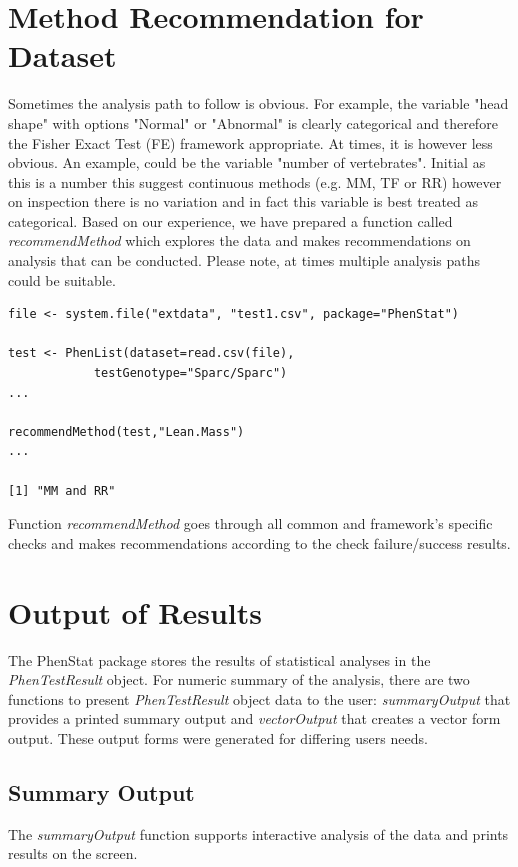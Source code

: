 \documentclass[12pt,a4paper]{article}
\begin{document}
\section{Method Recommendation for Dataset}
\label{section:Recommendation}

Sometimes the analysis path to follow is obvious. For example, the variable "head shape" with options "Normal" or "Abnormal" is clearly categorical and therefore the Fisher Exact Test (FE) framework appropriate. At times, it is however less obvious. An example, could be the variable "number of vertebrates". Initial as this is a number this suggest continuous methods (e.g. MM, TF or RR)  however on inspection there is no variation and in fact this variable is best treated as categorical. Based on our experience, we have prepared a function called \textit{recommendMethod} which explores the data and makes recommendations on analysis that can be conducted. Please note, at times multiple analysis paths could be suitable. 


\begingroup
\fontsize{8pt}{12pt}\selectfont
\begin{verbatim}
file <- system.file("extdata", "test1.csv", package="PhenStat")

test <- PhenList(dataset=read.csv(file),
            testGenotype="Sparc/Sparc")
...

recommendMethod(test,"Lean.Mass")
...

[1] "MM and RR"
\end{verbatim}
\endgroup

Function \textit{recommendMethod} goes through all common and framework's specific checks and makes recommendations according to the check failure/success results.  
\section{Output of Results}
\label{section:Results}
The PhenStat package stores the results of statistical analyses in the \textit{PhenTestResult} object.  
For numeric summary of the analysis, there are two functions to present \textit{PhenTestResult} object data to the user: 
\textit{summaryOutput} that provides a printed summary output and \textit{vectorOutput} that creates a vector form output. 
These output forms were generated for differing users needs. 

\subsection{Summary Output}
\label{SummaryOutput}
The \textit{summaryOutput} function supports interactive analysis of the data and prints results on the screen.
\end{document}
